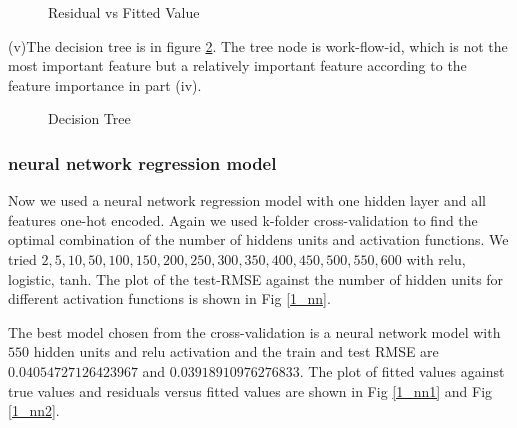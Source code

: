 \documentclass{article}
\begin{document}
\begin{figure}[!htbp]
\centering
{}
\caption{Residual vs Fitted Value} \label{2biv2}
\end{figure} 

(v)The decision tree is in figure \ref{2bv}. The tree node is work-flow-id, which is not the most important feature but a relatively important feature according to the feature importance in part (iv). 

\begin{figure}[!htbp]
\centering
{}
\caption{Decision Tree} \label{2bv}
\end{figure}

\subsubsection{neural network regression model}

Now we used a neural network regression model with one hidden layer and all features one-hot encoded. Again we used k-folder cross-validation to find the optimal combination of the number of hiddens units and activation functions. We tried $2, 5, 10, 50, 100, 150, 200, 250, 300, 350, 400, 450, 500, 550, 600$ with relu, logistic, tanh. The plot of the test-RMSE against the number of hidden units for different activation functions is shown in Fig \ref{1_nn}.

The best model chosen from the cross-validation is a neural network model with $550$ hidden units and relu activation and the train and test RMSE are $0.04054727126423967$ and $0.03918910976276833$. The plot of fitted values against true values and residuals versus fitted values are shown in Fig \ref{1_nn1} and Fig \ref{1_nn2}.
\end{document}
